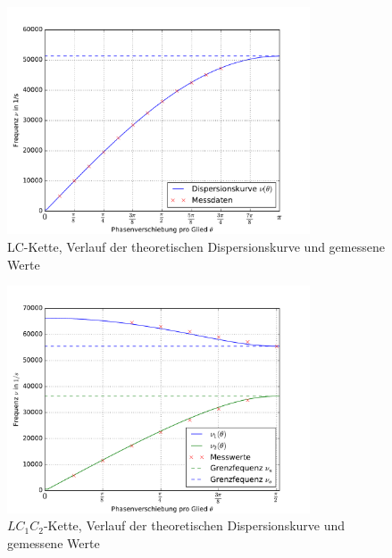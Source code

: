 \begin{figure}
  \centering
  \includegraphics[width = 0.8\textwidth]{../Messdaten/plots/dispersion.pdf}
  \caption{LC-Kette, Verlauf der theoretischen Dispersionskurve und gemessene Werte}
  \label{fig: dispersion_LC}
\end{figure}
\begin{figure}
  \centering
  \includegraphics[width = 0.8\textwidth]{../Messdaten/plots/dispersion1.pdf}
  \caption{$LC_1C_2$-Kette, Verlauf der theoretischen Dispersionskurve und gemessene Werte}
  \label{fig: dispersion_LC1C2}
\end{figure}
\FloatBarrier


